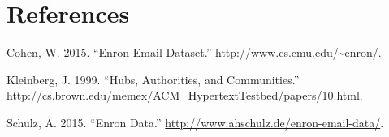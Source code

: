 \documentclass[]{article}
\begin{document}
\newpage

\section*{References}\label{references}

\hypertarget{refs}{}
\hypertarget{ref-Cohen2015}{}
Cohen, W. 2015. ``Enron Email Dataset.''
\url{http://www.cs.cmu.edu/~enron/}.

\hypertarget{ref-Klein1999}{}
Kleinberg, J. 1999. ``Hubs, Authorities, and Communities.''
\url{http://cs.brown.edu/memex/ACM_HypertextTestbed/papers/10.html}.

\hypertarget{ref-Schulz2015}{}
Schulz, A. 2015. ``Enron Data.''
\url{http://www.ahschulz.de/enron-email-data/}.
\end{document}
